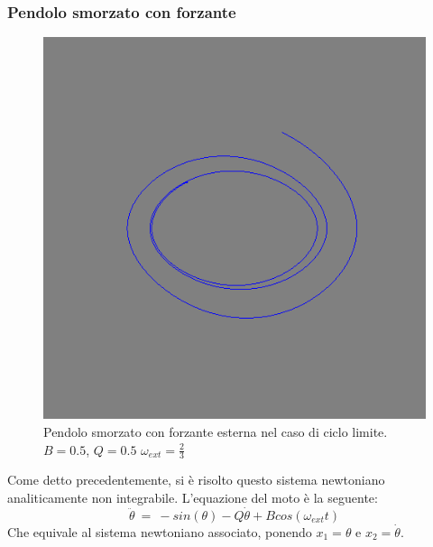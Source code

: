 \subsubsection{Pendolo smorzato con forzante}
\begin{figure}[!h]
  \centering
  \includegraphics[width = 0.5\columnwidth]{pendolo_limite.png}
  \caption{\small{Pendolo smorzato con forzante esterna nel caso di ciclo limite. $B = 0.5$, $Q= 0.5$ $\omega_{ext} = \tfrac{2}{3}$}}
  \end{figure}


Come detto precedentemente, si è risolto questo sistema newtoniano analiticamente non integrabile. L'equazione del moto è la seguente:
$$
  \ddot{\theta} \ = \ -sin(\theta) -Q \dot{\theta}+B cos(\omega_{ext} t)
$$
Che equivale al sistema newtoniano associato, ponendo $ x_1 = \theta $ e $x_2 = \dot{\theta}$.

